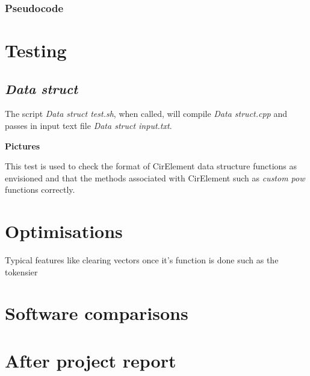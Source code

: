 \documentclass[12pt,a4paper]{article}
\begin{document}
\subsubsection{Pseudocode}
\pagebreak

\section{Testing}
\subsection{\textit{Data struct}}
The script \textit{Data struct test.sh}, when called, will compile \textit{Data struct.cpp} and passes in input 
text file \textit{Data struct input.txt}. 
\par
\textbf{Pictures}
\par
This test is used to check the format of CirElement data structure functions as envisioned and that the methods associated with
CirElement such as \textit{custom pow} functions correctly.
\pagebreak

\section{Optimisations}
Typical features like clearing vectors once it's function is done such as the tokensier
\pagebreak

\section{Software comparisons}
\pagebreak

\section{After project report}
\pagebreak

\printbibliography[title={References}]
\end{document}
